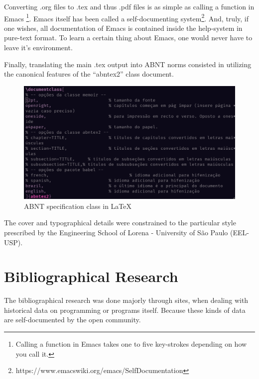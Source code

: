 \documentclass[
12pt,				%
openright,			%
oneside,			%
a4paper,			%
brazil,				%
english,			%
]{abntex2}
\begin{document}
Converting .org files to .tex and thus .pdf files is as
simple as calling a function in Emacs \footnote{Calling a function in
  Emacs takes one to five key-strokes
depending on how you call it.}. Emacs itself has been called a
self-documenting system\footnote{https://www.emacswiki.org/emacs/SelfDocumentation}. And, truly, if one wishes, all documentation
of Emacs is contained inside the help-system in pure-text format. To
learn a certain thing about Emacs, one would never have to leave it's
environment.

Finally, translating the main .tex output into ABNT norms consisted in
utilizing the canonical features of the ``abntex2'' class document.

\begin{figure}[ht]
  \centering
  \caption{\label{fig:abntex} ABNT specification class in LaTeX}
  \includegraphics[width=\linewidth]{abnt.png}
\end{figure}

The cover and typographical details were constrained to the particular
style prescribed by the Engineering School of Lorena - University of
São Paulo (EEL-USP).

\section{Bibliographical Research}

The bibliographical research was done majorly through sites, when
dealing with historical data on programming or programs
itself. Because these kinds of data are self-documented by the open
community.
\end{document}

